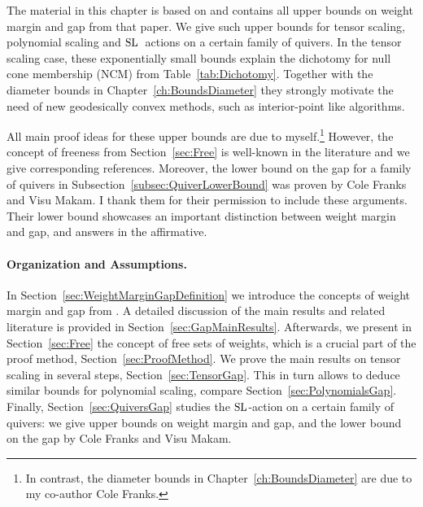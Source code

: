 




The material in this chapter is based on \cite{WeightMargin} and contains all upper bounds on weight margin and gap from that paper. We give such upper bounds for tensor scaling, polynomial scaling and $\operatorname{SL}$~actions on a certain family of quivers.
In the tensor scaling case, these exponentially small bounds explain the dichotomy for null cone membership (NCM) from Table~\ref{tab:Dichotomy}. Together with the diameter bounds in Chapter~\ref{ch:BoundsDiameter} they strongly motivate the need of new geodesically convex methods, such as interior-point like algorithms.

All main proof ideas for these upper bounds are due to myself.\footnote{In contrast, the diameter bounds in Chapter~\ref{ch:BoundsDiameter} are due to my co-author Cole Franks.}
However, the concept of freeness from Section~\ref{sec:Free} is well-known in the literature and we give corresponding references. Moreover, the lower bound on the gap for a family of quivers in Subsection~\ref{subsec:QuiverLowerBound} was proven by Cole Franks and Visu Makam. I thank them for their permission to include these arguments. Their lower bound showcases an important distinction between weight margin and gap, and answers \cite[Problem~4.27]{WeightMargin} in the affirmative.




\paragraph{Organization and Assumptions.}
In Section~\ref{sec:WeightMarginGapDefinition} we introduce the concepts of weight margin and gap from \cite{GradflowArXiv}. A detailed discussion of the main results and related literature is provided in Section~\ref{sec:GapMainResults}. Afterwards, we present in Section~\ref{sec:Free} the concept of free sets of weights, which is a crucial part of the proof method, Section~\ref{sec:ProofMethod}. We prove the main results on tensor scaling in several steps, Section~\ref{sec:TensorGap}. This in turn allows to deduce similar bounds for polynomial scaling, compare Section~\ref{sec:PolynomialsGap}. Finally, Section~\ref{sec:QuiversGap} studies the $\operatorname{SL}$-action on a certain family of quivers: we give upper bounds on weight margin and gap, and the lower bound on the gap by Cole Franks and Visu Makam.

